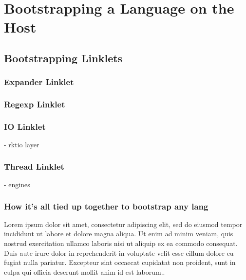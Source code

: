 \chapter{Bootstrapping a Language on the Host}
	\section{Bootstrapping Linklets}

	\subsection{Expander Linklet}
	\subsection{Regexp Linklet}
	\subsection{IO Linklet}
		- rktio layer
	\subsection{Thread Linklet}
		- engines
	\subsection{How it's all tied up together to bootstrap any lang} 

Lorem ipsum dolor sit amet, consectetur adipiscing elit, sed do eiusmod tempor incididunt ut labore et dolore magna aliqua. Ut enim ad minim veniam, quis nostrud exercitation ullamco laboris nisi ut aliquip ex ea commodo consequat. Duis aute irure dolor in reprehenderit in voluptate velit esse cillum dolore eu fugiat nulla pariatur. Excepteur sint occaecat cupidatat non proident, sunt in culpa qui officia deserunt mollit anim id est laborum..
